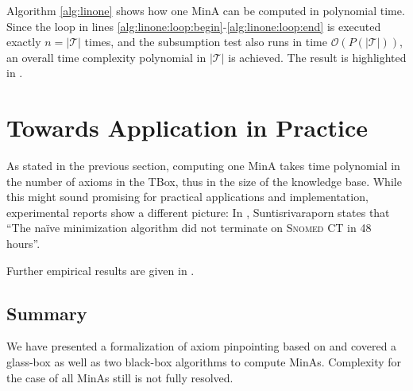 \documentclass{llncs}
\newcommand{\tb}{\ensuremath{\mathcal{T}}\xspace} %
\newcommand{\snomed}{\textsc{Snomed CT}\xspace}
\begin{document}
Algorithm \ref{alg:linone} shows how one MinA can be computed in polynomial time. Since the loop in lines \ref{alg:linone:loop:begin}-\ref{alg:linone:loop:end} is executed exactly $n = |\tb|$ times, and the subsumption test also runs in time $\mathcal{O}(P(|\tb|))$, an overall time complexity polynomial in $|\tb|$ is achieved. The result is highlighted in \cite[Thm.~6]{orig1,orig2}.

\section{Towards Application in Practice}

As stated in the previous section, computing one MinA takes time polynomial in the number of axioms in the TBox, thus in the size of the knowledge base. While this might sound promising for practical applications and implementation, experimental reports show a different picture: In \cite[Sec.~5.2, p.~97]{meng-phd}, Suntisrivaraporn states that \enquote{The na\"{i}ve minimization algorithm did not terminate on \snomed in 48 hours}.

Further empirical results are given in \cite[Sec.~6.2.5, p.~127]{meng-phd}.

\subsection{Summary}

We have presented a formalization of axiom pinpointing based on \cite{orig1,orig2} and covered a glass-box as well as two black-box algorithms to compute MinAs. Complexity for the case of all MinAs still is not fully resolved.


\end{document}
